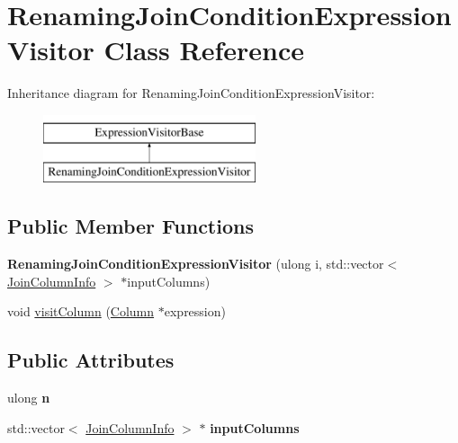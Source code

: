 \hypertarget{class_renaming_join_condition_expression_visitor}{\section{Renaming\+Join\+Condition\+Expression\+Visitor Class Reference}
\label{class_renaming_join_condition_expression_visitor}
}
Inheritance diagram for Renaming\+Join\+Condition\+Expression\+Visitor\+:\begin{figure}[H]
\begin{center}
\leavevmode
\includegraphics[height=2.000000cm]{class_renaming_join_condition_expression_visitor}
\end{center}
\end{figure}
\subsection*{Public Member Functions}
\begin{DoxyCompactItemize}
\item 
\hypertarget{class_renaming_join_condition_expression_visitor_a2b0669f3664fd3b9170e431bfcde9851}{{\bfseries Renaming\+Join\+Condition\+Expression\+Visitor} (ulong i, std\+::vector$<$ \hyperlink{class_join_column_info}{Join\+Column\+Info} $>$ $\ast$input\+Columns)}\label{class_renaming_join_condition_expression_visitor_a2b0669f3664fd3b9170e431bfcde9851}

\item 
void \hyperlink{class_renaming_join_condition_expression_visitor_aa55184f591960115d4e11eff4be0d3d5}{visit\+Column} (\hyperlink{class_column}{Column} $\ast$expression)
\end{DoxyCompactItemize}
\subsection*{Public Attributes}
\begin{DoxyCompactItemize}
\item 
\hypertarget{class_renaming_join_condition_expression_visitor_aa9eacf839bdb9a30653d5cae0448532b}{ulong {\bfseries n}}\label{class_renaming_join_condition_expression_visitor_aa9eacf839bdb9a30653d5cae0448532b}

\item 
\hypertarget{class_renaming_join_condition_expression_visitor_a8b8dceeedbf7c4d3aac3761ce3a4c302}{std\+::vector$<$ \hyperlink{class_join_column_info}{Join\+Column\+Info} $>$ $\ast$ {\bfseries input\+Columns}}\label{class_renaming_join_condition_expression_visitor_a8b8dceeedbf7c4d3aac3761ce3a4c302}

\end{DoxyCompactItemize}


